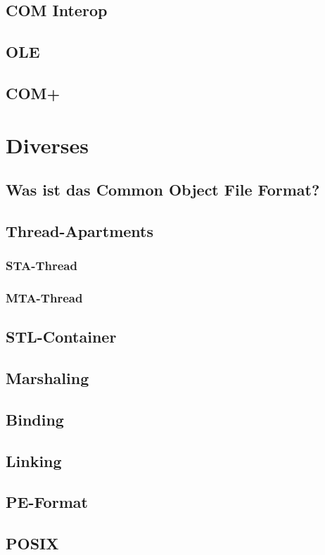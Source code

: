\begin{multicols}{3}
\subsection{COM Interop}
\lipsum[1]

\subsection{OLE}
\lipsum[1]

\subsection{COM+}
\lipsum[1]

\section{Diverses}

\subsection{Was ist das Common Object File Format?}
\lipsum[1]

\subsection{Thread-Apartments}

\subsubsection{STA-Thread}
\lipsum[1]

\subsubsection{MTA-Thread}
\lipsum[1]

\subsection{STL-Container}
\lipsum[1]

\subsection{Marshaling}
\lipsum[1]

\subsection{Binding}
\lipsum[1]

\subsection{Linking}
\lipsum[1]

\subsection{PE-Format}
\lipsum[1]

\subsection{POSIX}
\lipsum[1]


\end{multicols}